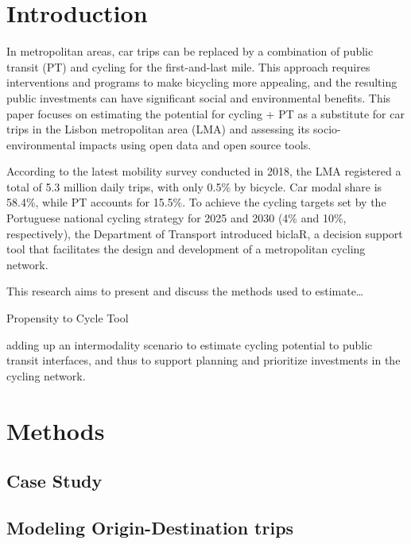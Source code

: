 \documentclass[runningheads]{llncs}
\begin{document}
\hypertarget{introduction}{%
\section{Introduction}\label{introduction}}

In metropolitan areas, car trips can be replaced by a combination of
public transit (PT) and cycling for the first-and-last mile. This
approach requires interventions and programs to make bicycling more
appealing, and the resulting public investments can have significant
social and environmental benefits. This paper focuses on estimating the
potential for cycling + PT as a substitute for car trips in the Lisbon
metropolitan area (LMA) and assessing its socio-environmental impacts
using open data and open source tools.

According to the latest mobility survey conducted in 2018, the LMA
registered a total of 5.3 million daily trips, with only 0.5\% by
bicycle. Car modal share is 58.4\%, while PT accounts for 15.5\%. To
achieve the cycling targets set by the Portuguese national cycling
strategy for 2025 and 2030 (4\% and 10\%, respectively), the Department
of Transport introduced biclaR, a decision support tool that facilitates
the design and development of a metropolitan cycling network.

This research aims to present and discuss the methods used to
estimate\ldots{}

Propensity to Cycle Tool

adding up an intermodality scenario to estimate cycling potential to
public transit interfaces, and thus to support planning and prioritize
investments in the cycling network.

\hypertarget{methods}{%
\section{Methods}\label{methods}}

\hypertarget{case-study}{%
\subsection{Case Study}\label{case-study}}

\hypertarget{modeling-origin-destination-trips}{%
\subsection{Modeling Origin-Destination
trips}\label{modeling-origin-destination-trips}}
\end{document}
